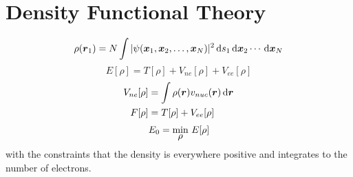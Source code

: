 \section{Density Functional Theory} \label{sec:DFT}
\begin{equation}
    \rho(\boldsymbol r_1) = N \int |\psi(\boldsymbol x_1,\boldsymbol x_2,\dots,\boldsymbol x_N)|^2 
	\,\mathrm{d} s_1 \,\mathrm{d} \boldsymbol x_2 \cdots \,\mathrm{d} \boldsymbol x_N
\end{equation}
\begin{equation}
    E[\rho] = T[\rho] + V_{ne}[\rho] + V_{ee}[\rho]
\end{equation}
\begin{align}
    V_{ne}[\rho] &= \int \rho(\boldsymbol r)v_{nuc}(\boldsymbol r) \,\mathrm{d} \boldsymbol r\\
    F[\rho] &= T[\rho] + V_{ee}[\rho]
\end{align}
\begin{equation}
    E_0 = \mymin{\rho}\ E[\rho]
\end{equation}
with the constraints that the density is everywhere positive and integrates to the number
of electrons.

